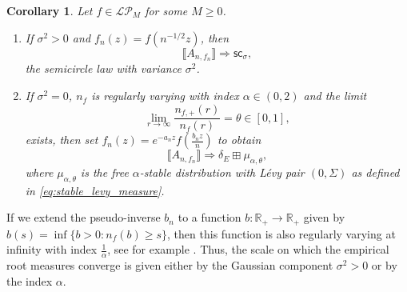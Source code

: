 \documentclass[reqno]{amsart}
\newcommand{\oindicator}[1]{\ensuremath{\mathbf{1}_{{#1}}}}
\newcommand{\1}{\mathbf{1}}
\newcommand{\dd}{\mathrm{d}}
\newcommand{\R}{\mathbb{R}}
\def\R{\mathbb{R}}
\newcommand{\LP}{\mathcal{LP}}
\theoremstyle{plain}
\newtheorem{corollary}[theorem]{Corollary}
\theoremstyle{definition}
\theoremstyle{remark}
\numberwithin{equation}{section}
\begin{document}
\begin{corollary}\label{cor:fixed f and stable laws}
	Let $f\in\LP_{M}$ for some $M\geq 0$. \begin{enumerate}
		\item If $\sigma^2>0$ and $f_n(z)=f(n^{-1/2}z)$, then \begin{equation}
			\llbracket A_{n,f_n}\rrbracket\Rightarrow \mathsf{sc_{\sigma}},
		\end{equation} the semicircle law with variance $\sigma^2$. 
		
		\item If $\sigma^2=0$, $n_f$ is regularly varying with index $\alpha\in (0,2)$ and the limit\begin{equation}\label{eq:theta def}
			\lim\limits_{r\rightarrow\infty} \frac{n_{f,+}(r)}{n_{f}(r)}=\theta\in[0,1],
		\end{equation} exists,  then set $f_n(z)=e^{-a_nz}f\left(\frac{b_nz}{n}\right)$ to obtain
		\begin{equation}
		\llbracket A_{n,f_n}\rrbracket\Rightarrow\delta_{E}\boxplus\mu_{\alpha,\theta},
		\end{equation}  where $\mu_{\alpha,\theta}$ is the free $\alpha$-stable distribution with L\'evy pair $(0,\Sigma)$ as defined in \eqref{eq:stable_levy_measure}.
	\end{enumerate}
\end{corollary} 
 If we extend the pseudo-inverse $b_n$ to a function $b:\R_+\rightarrow\R_+$ given by $b(s)=\inf\{b>0:n_f(b)\geq s\}$, then this function is also regularly varying at infinity with index $\frac{1}{\alpha}$, see for example \cite{Resnick2007}. Thus, the scale on which the empirical root measures converge is given either by the Gaussian component $\sigma^2>0$ or by the index $\alpha$.   
\end{document}
